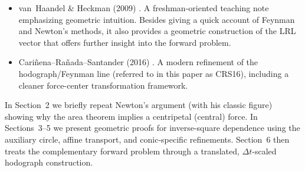 \begin{itemize}
  \item van~Haandel \& Heckman (2009) \cite{vanhaandelheckman2009teaching}. A freshman-oriented teaching note emphasizing geometric intuition. Besides giving a quick account of Feynman and Newton's methods, it also provides a geometric construction of the LRL vector that offers further insight into the forward problem.

  \item Cari\~nena--Ra\~nada--Santander (2016) \cite{carinena2016newlook}. A modern refinement of the hodograph/Feynman line (referred to in this paper as CRS16), including a cleaner force-center transformation framework.
\end{itemize}

In Section~2 we briefly repeat Newton's argument (with his classic figure) showing why the area theorem implies a centripetal (central) force. In Sections~3--5 we present geometric proofs for inverse-square dependence using the auxiliary circle, affine transport, and conic-specific refinements. Section~6 then treats the complementary forward problem through a translated, $\Delta t$-scaled hodograph construction.
